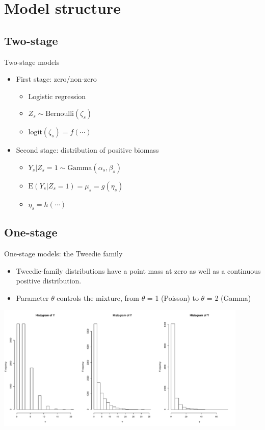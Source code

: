 \documentclass{beamer}
\begin{document}
\section{Model structure}

\subsection{Two-stage}

\begin{frame}[fragile]{Two-stage models}
  \begin{itemize}
    \item First stage: zero/non-zero
    \begin{itemize}
      \item Logistic regression
      \item $Z_s \sim \text{Bernoulli}(\zeta_s)$
      \item $\text{logit}(\zeta_s) = f(\cdots)$
    \end{itemize}
    \item Second stage: distribution of positive biomass
    \begin{itemize}
      \item $Y_s|Z_s=1 \sim \text{Gamma}(\alpha_s, \beta_s)$
      \item $\text{E}\left(Y_s|Z_s=1\right) = \mu_s = g(\eta_s)$
      \item $\eta_s = h(\cdots)$
    \end{itemize}
  \end{itemize}
\end{frame}


\subsection{One-stage}

\begin{frame}[fragile]{One-stage models: the Tweedie family}
  \begin{itemize}
    \item Tweedie-family distributions have a point mass at zero as well as a continuous positive distribution.\\
    \item Parameter $\theta$ controls the mixture, from $\theta$ = 1 (Poisson) to $\theta$ = 2 (Gamma)
  \end{itemize}
  \begin{center}
      \includegraphics[width=0.9\textwidth]{../../figures/tweedie-sim.pdf}
  \end{center}
\end{frame}  
\end{document}
